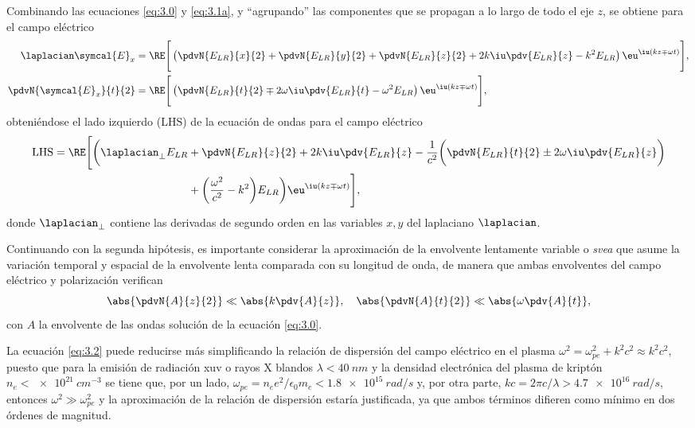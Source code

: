 Combinando las ecuaciones \eqref{eq:3.0} y \eqref{eq:3.1a}, y \enquote{agrupando} las componentes que se propagan a lo largo de todo el eje $z$, se obtiene para el campo eléctrico
\begin{align}
  \laplacian \symcal{E}_{x} 
  &= 
  \RE \Bigg[\left(\pdvN{E_{LR}}{x}{2} + \pdvN{E_{LR}}{y}{2} + \pdvN{E_{LR}}{z}{2} + 2k \iu \pdv{E_{LR}}{z} - k^{2}E_{LR}\right)\eu^{\iu (kz \mp \omega t)}\Bigg], \\
  \pdvN{\symcal{E}_{x}}{t}{2}
  &= 
  \RE \Bigg[\left(\pdvN{E_{LR}}{t}{2} \mp 2 \omega \iu \pdv{E_{LR}}{t} - \omega^{2}E_{LR}\right)\eu^{\iu (kz \mp \omega t)}\Bigg],
\end{align}
obteniéndose el lado izquierdo ($\mathrm{LHS}$) de la ecuación de ondas para el campo eléctrico
\begin{equation}\label{eq:3.2}
  \begin{split}
    \mathrm{LHS} = \RE \Bigg[\bigg(\laplacian_{\perp}E_{LR} &+ \pdvN{E_{LR}}{z}{2} + 2k \iu \pdv{E_{LR}}{z} - \frac{1}{c^{2}}\bigg(\pdvN{E_{LR}}{t}{2} \pm 2 \omega \iu \pdv{E_{LR}}{z}\bigg) \\ &+  \bigg(\frac{\omega^{2}}{c^{2}} - k^{2}\bigg)E_{LR}\bigg)\eu^{\iu(kz \mp \omega t)}\Bigg],
  \end{split}
\end{equation}
donde $\laplacian_{\perp}$ contiene las derivadas de segundo orden en las variables $x, y$ del laplaciano $\laplacian $.

Continuando con la segunda hipótesis, es importante considerar la aproximación de la envolvente lentamente variable o \emph{\acrfull{svea}} que asume la variación temporal y espacial de la envolvente lenta\autocite{Larroche2000} comparada con su longitud de onda, de manera que ambas envolventes del campo eléctrico y polarización verifican
\begin{equation}\label{eq:3.3}
  \abs{\pdvN{A}{z}{2}} \ll \abs{k \pdv{A}{z}}, \quad \abs{\pdvN{A}{t}{2}} \ll \abs{\omega \pdv{A}{t}},
\end{equation}
con $A$ la envolvente de las ondas solución de la ecuación \eqref{eq:3.0}. 

La ecuación \eqref{eq:3.2} puede reducirse más simplificando la relación de dispersión del campo eléctrico en el plasma $\omega^{2} = \omega^{2}_{pe} + k^{2}c^{2}\approx k^{2}c^{2}$, puesto que para la emisión de radiación \acrshort{xuv} o rayos X blandos $\lambda<\qty{40}{nm}$ y la densidad electrónica del plasma de kriptón $n_e<\qty{e21}{cm^{-3}}$ se tiene que, por un lado, $\omega_{pe}=n_{e}e^{2}/\epsilon_{0}m_{e}<\qty{1,8e15}{rad/s}$ y, por otra parte, $kc=2 \pi c/\lambda>\qty{4,7e16}{rad/s}$, entonces $\omega^{2} \gg \omega_{pe}^{2}$ y la aproximación de la relación de dispersión estaría justificada, ya que ambos términos difieren como mínimo en dos órdenes de magnitud. 

